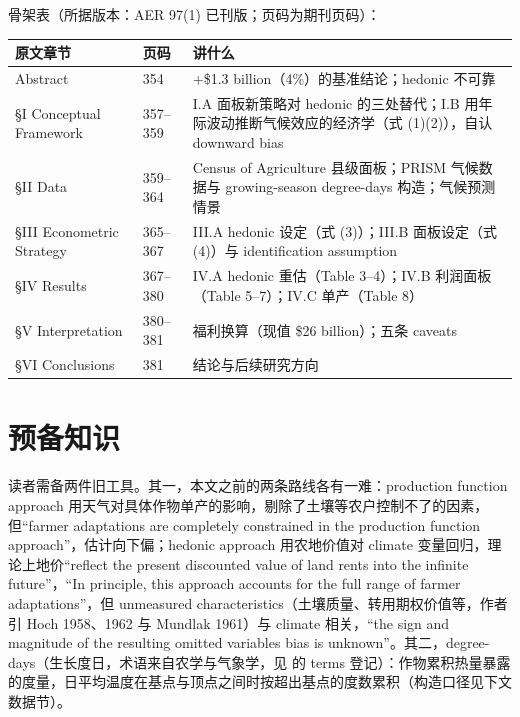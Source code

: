 骨架表（所据版本：AER 97(1) 已刊版；页码为期刊页码）：

\begin{table}[htbp]
\centering\small
\begin{tabular}{@{}p{2.6cm}p{1.6cm}p{8.6cm}@{}}
\toprule
原文章节 & 页码 & 讲什么 \\
\midrule
Abstract & 354 & +\$1.3 billion（4\%）的基准结论；hedonic 不可靠 \\
\S I Conceptual Framework & 357--359 & I.A 面板新策略对 hedonic 的三处替代；I.B 用年际波动推断气候效应的经济学（式 (1)(2)），自认 downward bias \\
\S II Data & 359--364 & Census of Agriculture 县级面板；PRISM 气候数据与 growing-season degree-days 构造；气候预测情景 \\
\S III Econometric Strategy & 365--367 & III.A hedonic 设定（式 (3)）；III.B 面板设定（式 (4)）与 identification assumption \\
\S IV Results & 367--380 & IV.A hedonic 重估（Table 3--4）；IV.B 利润面板（Table 5--7）；IV.C 单产（Table 8） \\
\S V Interpretation & 380--381 & 福利换算（现值 \$26 billion）；五条 caveats \\
\S VI Conclusions & 381 & 结论与后续研究方向 \\
\bottomrule
\end{tabular}
\end{table}

\section{预备知识}

读者需备两件旧工具。其一，本文之前的两条路线各有一难：production function approach 用天气对具体作物单产的影响，剔除了土壤等农户控制不了的因素，但``farmer adaptations are completely constrained in the production function approach''\citep[第~355 页]{deschenes2007economic}，估计向下偏；hedonic approach 用农地价值对 climate 变量回归，理论上地价``reflect the present discounted value of land rents into the infinite future''\citep[第~355 页]{deschenes2007economic}，``In principle, this approach accounts for the full range of farmer adaptations''\citep[第~355 页]{deschenes2007economic}，但 unmeasured characteristics（土壤质量、转用期权价值等，作者引 Hoch 1958、1962 与 Mundlak 1961）与 climate 相关，``the sign and magnitude of the resulting omitted variables bias is unknown''\citep[第~355 页]{deschenes2007economic}。其二，degree-days（生长度日，术语来自农学与气象学，见  的 terms 登记）：作物累积热量暴露的度量，日平均温度在基点与顶点之间时按超出基点的度数累积（构造口径见下文数据节）。

